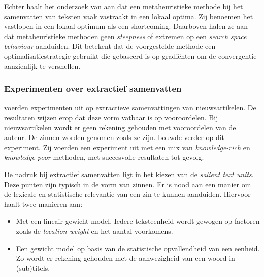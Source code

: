 Echter haalt het onderzoek van \textcite{Rani2021} aan dat een metaheuristieke methode bij het samenvatten van teksten vaak vastraakt in een lokaal optima. Zij benoemen het vastlopen in een lokaal optimum als een shortcoming. Daarboven halen ze aan dat metaheuristieke methoden geen \textit{steepness} of extremen op een \textit{search space behaviour} aanduiden. Dit betekent dat de voorgestelde methode een optimalisatiestrategie gebruikt die gebaseerd is op gradiënten om de convergentie aanzienlijk te versnellen. 



\subsubsection{Experimenten over extractief samenvatten}


\textcite{McKeown1999} voerden experimenten uit op extractieve samenvattingen van nieuwsartikelen. De resultaten wijzen erop dat deze vorm vatbaar is op vooroordelen. Bij nieuwsartikelen wordt er geen rekening gehouden met vooroordelen van de auteur. De zinnen worden genomen zoals ze zijn. \textcite{Hahn2000} bouwde verder op dit experiment. Zij voerden een experiment uit met een mix van \textit{knowledge-rich} en \textit{knowledge-poor} methoden, met succesvolle resultaten tot gevolg.

De nadruk bij extractief samenvatten ligt in het kiezen van de \textit{salient text units}. Deze punten zijn typisch in de vorm van zinnen. Er is nood aan een manier om de lexicale en statistische relevantie van een zin te kunnen aanduiden. Hiervoor haalt \textcite{Hahn2000} twee manieren aan:

\begin{itemize}
	\item Met een lineair gewicht model. Iedere teksteenheid wordt gewogen op factoren zoals de \textit{location weight} en het aantal voorkomens.
	\item Een gewicht model op basis van de statistische opvallendheid van een eenheid. Zo wordt er rekening gehouden met de aanwezigheid van een woord in (sub)titels.
\end{itemize}

